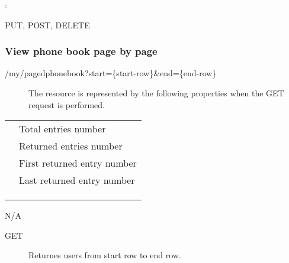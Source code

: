 \documentclass[letterpaper,10pt,english]{sphinxmanual}
\begin{document}
:

\begin{sphinxVerbatim}[commandchars=\\\{\}]
\end{sphinxVerbatim}

 PUT, POST, DELETE


\subsubsection{View phone book page by page}
\label{\detokenize{restapi:view-phone-book-page-by-page}}
 /my/pagedphonebook?start=\{start-row\}\&end=\{end-row\}
\begin{description}
\item[{}] \leavevmode
The resource is represented by the following properties when the GET request is performed.

\end{description}


\begin{savenotes}\sphinxattablestart
\centering
\begin{tabulary}{\linewidth}[t]{|T|T|}
\hline

&
\\
\hline
{}
&
Total entries number
\\
\hline
{}
&
Returned entries number
\\
\hline
{}
&
First returned entry number
\\
\hline
{}
&
Last returned entry number
\\
\hline
{}
&\\
\hline
{}
&\\
\hline
{}
&\\
\hline
\end{tabulary}
\par
\sphinxattableend\end{savenotes}

 N/A
\begin{description}
\item[{ GET}] \leavevmode
Returnes users from start row to end row.

\end{description}
\end{document}
